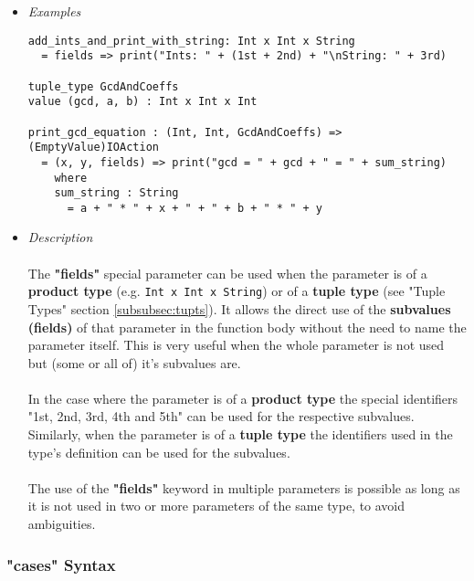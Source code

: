\documentclass{article}
\begin{document}
\begin{itemize}

\item \textit{Examples}
\begin{verbatim}
add_ints_and_print_with_string: Int x Int x String
  = fields => print("Ints: " + (1st + 2nd) + "\nString: " + 3rd)

tuple_type GcdAndCoeffs
value (gcd, a, b) : Int x Int x Int

print_gcd_equation : (Int, Int, GcdAndCoeffs) => (EmptyValue)IOAction
  = (x, y, fields) => print("gcd = " + gcd + " = " + sum_string)
    where
    sum_string : String
      = a + " * " + x + " + " + b + " * " + y
\end{verbatim}

\item \textit{Description}\\\\
The \textbf{"fields"} special parameter can be used when the parameter is of a
\textbf{product type} (e.g. \texttt{Int x Int x String}) or of a \textbf{tuple
type} (see "Tuple Types" section \ref{subsubsec:tupts}).  It allows the direct
use of the \textbf{subvalues (fields)} of that parameter in the function body
without the need to name the parameter itself. This is very useful when the
whole parameter is not used but (some or all of) it's subvalues are.
\\\\
In the case where the parameter is of a \textbf{product type} the special identifiers
"1st, 2nd, 3rd, 4th and 5th" can be used for the respective subvalues.
Similarly, when the parameter is of a \textbf{tuple type} the identifiers used in
the type's definition can be used for the subvalues. 
\\\\
The use of the \textbf{"fields"} keyword in multiple parameters is possible as
long as it is not used in two or more parameters of the same type, to avoid 
ambiguities.

\end{itemize}

\subsubsection{"cases" Syntax}
\label{subsubsec:casessyntax}
\end{document}
